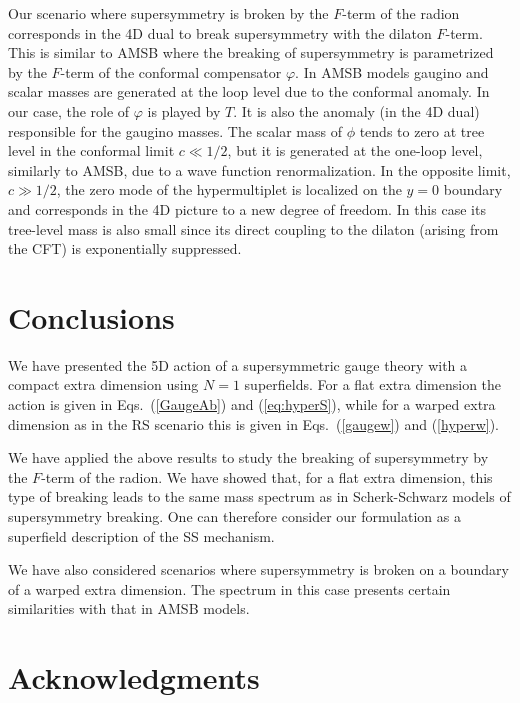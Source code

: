 \documentclass[a4paper,12pt]{article}
\begin{document}
Our scenario where supersymmetry is broken by the $F$-term
of the radion corresponds in the 4D dual 
to break supersymmetry
with the dilaton $F$-term.
This is 
similar to AMSB where the breaking
of supersymmetry is parametrized by the $F$-term of 
the conformal compensator $\varphi$.
In AMSB models
gaugino and scalar masses are generated at the loop level
due to the conformal anomaly.
In our case, the role of $\varphi$ is played by $T$. 
It is also the anomaly (in the 4D dual)  responsible for the 
gaugino masses. 
The scalar mass of $\phi$ tends to zero at tree level
in the conformal limit $c\ll 1/2$, 
but it is generated at the one-loop level, similarly to  AMSB,
due to a wave function renormalization. 
In the opposite limit, 
$c\gg 1/2$, the zero mode of the hypermultiplet is localized
on the $y=0$ boundary and corresponds in the 4D picture
to a new degree of
freedom.
In this case its  tree-level mass 
is also small since its direct coupling to the dilaton (arising from the CFT)
is exponentially suppressed.


\section{Conclusions}


We have presented the 5D action 
of a 
  supersymmetric gauge theory with 
a compact  extra dimension
using  $N=1$ superfields. 
For a flat extra dimension the
action is given in
Eqs.~(\ref{GaugeAb}) and (\ref{eq:hyperS}), while 
for a warped extra dimension as in the RS scenario
this  is given in
Eqs.~(\ref{gaugew}) and (\ref{hyperw}).


We have applied the above results
 to study the breaking of supersymmetry
by the $F$-term of the radion.
We have showed that, 
for  a flat extra dimension,
this type of breaking
 leads to 
the same mass spectrum as 
in  Scherk-Schwarz  models of supersymmetry breaking.
One can therefore
consider our  formulation 
as a superfield description of the SS mechanism.

We have also considered scenarios where supersymmetry
is broken on a boundary of a warped extra dimension.
The spectrum in this case presents certain 
similarities with that
in AMSB
models.



\vskip2cm


\section*{Acknowledgments}
\end{document}
